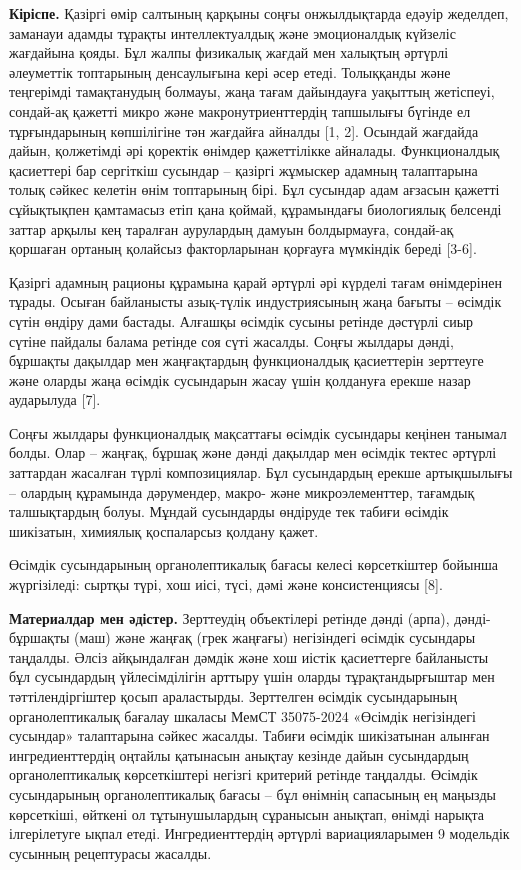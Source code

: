 \begin{multicols}{2}
{\bfseries Кіріспе.} Қазіргі өмір салтының қарқыны соңғы онжылдықтарда
едәуір жеделдеп, заманауи адамды тұрақты интеллектуалдық және
эмоционалдық күйзеліс жағдайына қояды. Бұл жалпы физикалық жағдай мен
халықтың әртүрлі әлеуметтік топтарының денсаулығына кері әсер етеді.
Толыққанды және теңгерімді тамақтанудың болмауы, жаңа тағам дайындауға
уақыттың жетіспеуі, сондай-ақ қажетті микро және макронутриенттердің
тапшылығы бүгінде ел тұрғындарының көпшілігіне тән жағдайға айналды
{[}1, 2{]}. Осындай жағдайда дайын, қолжетімді әрі қоректік өнімдер
қажеттілікке айналады. Функционалдық қасиеттері бар сергіткіш сусындар
-- қазіргі жұмыскер адамның талаптарына толық сәйкес келетін өнім
топтарының бірі. Бұл сусындар адам ағзасын қажетті сұйықтықпен
қамтамасыз етіп қана қоймай, құрамындағы биологиялық белсенді заттар
арқылы кең таралған аурулардың дамуын болдырмауға, сондай-ақ қоршаған
ортаның қолайсыз факторларынан қорғауға мүмкіндік береді {[}3-6{]}.

Қазіргі адамның рационы құрамына қарай әртүрлі әрі күрделі тағам
өнімдерінен тұрады. Осыған байланысты азық-түлік индустриясының жаңа
бағыты -- өсімдік сүтін өндіру дами бастады. Алғашқы өсімдік сусыны
ретінде дәстүрлі сиыр сүтіне пайдалы балама ретінде соя сүті жасалды.
Соңғы жылдары дәнді, бұршақты дақылдар мен жаңғақтардың функционалдық
қасиеттерін зерттеуге және оларды жаңа өсімдік сусындарын жасау үшін
қолдануға ерекше назар аударылуда {[}7{]}.

Соңғы жылдары функционалдық мақсаттағы өсімдік сусындары кеңінен танымал
болды. Олар -- жаңғақ, бұршақ және дәнді дақылдар мен өсімдік тектес
әртүрлі заттардан жасалған түрлі композициялар. Бұл сусындардың ерекше
артықшылығы -- олардың құрамында дәрумендер, макро- және
микроэлементтер, тағамдық талшықтардың болуы. Мұндай сусындарды өндіруде
тек табиғи өсімдік шикізатын, химиялық қоспаларсыз қолдану қажет.

Өсімдік сусындарының органолептикалық бағасы келесі көрсеткіштер бойынша
жүргізіледі: сыртқы түрі, хош иісі, түсі, дәмі және консистенциясы
{[}8{]}.

{\bfseries Материалдар мен әдістер.} Зерттеудің объектілері ретінде дәнді
(арпа), дәнді-бұршақты (маш) және жаңғақ (грек жаңғағы) негізіндегі
өсімдік сусындары таңдалды. Әлсіз айқындалған дәмдік және хош иістік
қасиеттерге байланысты бұл сусындардың үйлесімділігін арттыру үшін
оларды тұрақтандырғыштар мен тәттілендіргіштер қосып араластырды.
Зерттелген өсімдік сусындарының органолептикалық бағалау шкаласы МемСТ
35075-2024 «Өсімдік негізіндегі сусындар» талаптарына сәйкес жасалды.
Табиғи өсімдік шикізатынан алынған ингредиенттердің оңтайлы қатынасын
анықтау кезінде дайын сусындардың органолептикалық көрсеткіштері негізгі
критерий ретінде таңдалды. Өсімдік сусындарының органолептикалық бағасы
-- бұл өнімнің сапасының ең маңызды көрсеткіші, өйткені ол
тұтынушылардың сұранысын анықтап, өнімді нарықта ілгерілетуге ықпал
етеді. Ингредиенттердің әртүрлі вариацияларымен 9 модельдік сусынның
рецептурасы жасалды.
\end{multicols}

